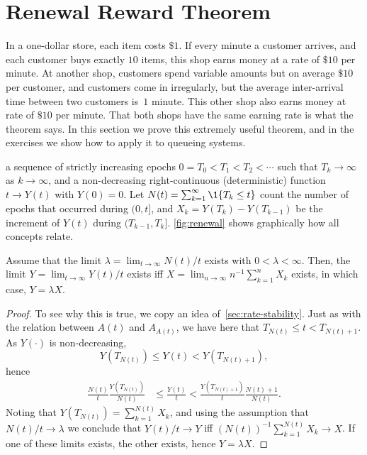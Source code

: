 \documentclass[queueing-book.tex]{subfiles}
\begin{document}
\section{Renewal Reward Theorem}
\label{sec:renew-reward-theor}

In a one-dollar store, each item costs $\$ 1$.
If every minute a customer arrives, and each customer buys exactly $10$ items, this shop earns money at a rate of $ \$ 10$ per minute.
At another shop, customers spend variable amounts but on average $\$ 10$ per customer, and customers come in irregularly, but the average inter-arrival time between two customers is~$1$ minute.
This other shop also earns money at rate of $\$ 10$ per minute.
That both shops have the same earning rate is what the  theorem says.
In this section we prove this extremely useful theorem, and in the exercises we show how to apply it to queueing systems.


 a sequence of strictly increasing epochs $0=T_0 < T_1 < T_2 < \cdots$ such that $T_k\to\infty$ as $k\to\infty$, and a non-decreasing right-continuous (deterministic) function $t\to Y(t)$ with $Y(0)=0$.
Let $N(t) = \sum_{k=1}^{\infty} \1{T_k\leq t}$ count the number of epochs that occurred during $(0, t]$, and $X_k = Y(T_k)-Y(T_{k-1})$ be the increment of $Y(t)$ during $(T_{k-1}, T_{k}]$.
\cref{fig:renewal} shows graphically how all concepts relate.



\begin{theorem}[Renewal Reward Theorem, $Y=\lambda X$]
Assume  that the limit $\lambda=\lim_{t\to\infty}N(t)/t$ exists with $0<\lambda<\infty$.
Then, the limit $Y=\lim_{t\to\infty}Y(t)/t$ exists iff $X = \lim_{n\to\infty} n^{-1}\sum_{k=1}^{n}X_{k}$ exists, in which
 case, $Y=\lambda X$.
\end{theorem}

\begin{proof}
To see why this is true, we copy an idea of~\cref{sec:rate-stability}. Just as with the relation between $A(t)$ and $A_{A(t)}$, we have here that  $T_{N(t)} \leq t < T_{N(t)+1}$. As $Y(\cdot)$ is non-decreasing,
\begin{equation*}
  Y(T_{N(t)}) \leq Y(t) < Y(T_{N(t)+1}),
\end{equation*}
hence
\begin{align*}
\frac{N(t)}{t} \frac{Y(T_{N(t)})}{N(t)}  &\leq \frac{Y(t)} t < \frac{Y(T_{N(t)+1})}{t} \frac{N(t)+1}{N(t)}.
\end{align*}
Noting that $Y(T_{N(t)}) = \sum_{k=1}^{N(t)} X_{k}$, and using the assumption that $N(t)/t \to \lambda$ we conclude that $Y(t)/t \to Y$ iff $(N(t))^{-1}\sum_{k=1}^{N(t)} X_{k} \to X$.
If one of these limits exists, the other exists, hence $Y=\lambda X$.
\end{proof}
\end{document}
